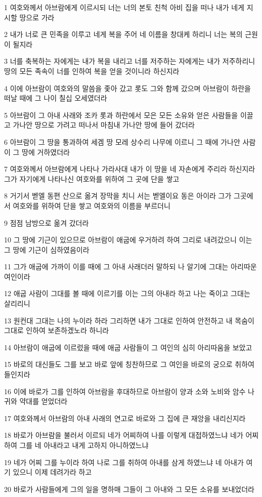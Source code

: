 \par 1 여호와께서 아브람에게 이르시되 너는 너의 본토 친척 아비 집을 떠나 내가 네게 지시할 땅으로 가라
\par 2 내가 너로 큰 민족을 이루고 네게 복을 주어 네 이름을 창대케 하리니 너는 복의 근원이 될지라
\par 3 너를 축복하는 자에게는 내가 복을 내리고 너를 저주하는 자에게는 내가 저주하리니 땅의 모든 족속이 너를 인하여 복을 얻을 것이니라 하신지라
\par 4 이에 아브람이 여호와의 말씀을 좇아 갔고 롯도 그와 함께 갔으며 아브람이 하란을 떠날 때에 그 나이 칠십 오세였더라
\par 5 아브람이 그 아내 사래와 조카 롯과 하란에서 모은 모든 소유와 얻은 사람들을 이끌고 가나안 땅으로 가려고 떠나서 마침내 가나안 땅에 들어 갔더라
\par 6 아브람이 그 땅을 통과하여 세겜 땅 모레 상수리 나무에 이르니 그 때에 가나안 사람이 그 땅에 거하였더라
\par 7 여호와께서 아브람에게 나타나 가라사대 내가 이 땅을 네 자손에게 주리라 하신지라 그가 자기에게 나타나신 여호와를 위하여 그 곳에 단을 쌓고
\par 8 거기서 벧엘 동편 산으로 옮겨 장막을 치니 서는 벧엘이요 동은 아이라 그가 그곳에서 여호와를 위하여 단을 쌓고 여호와의 이름을 부르더니
\par 9 점점 남방으로 옮겨 갔더라
\par 10 그 땅에 기근이 있으므로 아브람이 애굽에 우거하려 하여 그리로 내려갔으니 이는 그 땅에 기근이 심하였음이라
\par 11 그가 애굽에 가까이 이를 때에 그 아내 사래더러 말하되 나 알기에 그대는 아리따운 여인이라
\par 12 애굽 사람이 그대를 볼 때에 이르기를 이는 그의 아내라 하고 나는 죽이고 그대는 살리리니
\par 13 원컨대 그대는 나의 누이라 하라 그리하면 내가 그대로 인하여 안전하고 내 목숨이 그대로 인하여 보존하겠노라 하니라
\par 14 아브람이 애굽에 이르렀을 때에 애굽 사람들이 그 여인의 심히 아리따움을 보았고
\par 15 바로의 대신들도 그를 보고 바로 앞에 칭찬하므로 그 여인을 바로의 궁으로 취하여 들인지라
\par 16 이에 바로가 그를 인하여 아브람을 후대하므로 아브람이 양과 소와 노비와 암수 나귀와 약대를 얻었더라
\par 17 여호와께서 아브람의 아내 사래의 연고로 바로와 그 집에 큰 재앙을 내리신지라
\par 18 바로가 아브람을 불러서 이르되 네가 어찌하여 나를 이렇게 대접하였느냐 네가 어찌하여 그를 네 아내라고 내게 고하지 아니하였느냐
\par 19 네가 어찌 그를 누이라 하여 나로 그를 취하여 아내를 삼게 하였느냐 네 아내가 여기 있으니 이제 데려가라 하고
\par 20 바로가 사람들에게 그의 일을 명하매 그들이 그 아내와 그 모든 소유를 보내었더라

